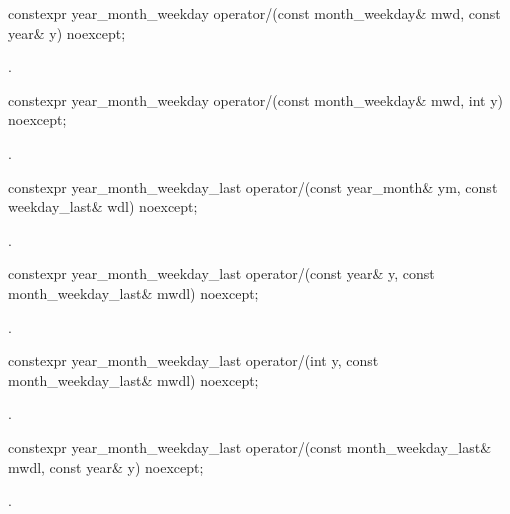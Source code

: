 \begin{itemdecl}
constexpr year_month_weekday
  operator/(const month_weekday& mwd, const year& y) noexcept;
\end{itemdecl}

\begin{itemdescr}
\pnum
\returns {}.
\end{itemdescr}

\begin{itemdecl}
constexpr year_month_weekday
  operator/(const month_weekday& mwd, int y) noexcept;
\end{itemdecl}

\begin{itemdescr}
\pnum
\returns {}.
\end{itemdescr}

\begin{itemdecl}
constexpr year_month_weekday_last
  operator/(const year_month& ym, const weekday_last& wdl) noexcept;
\end{itemdecl}

\begin{itemdescr}
\pnum
\returns {}.
\end{itemdescr}

\begin{itemdecl}
constexpr year_month_weekday_last
  operator/(const year& y, const month_weekday_last& mwdl) noexcept;
\end{itemdecl}

\begin{itemdescr}
\pnum
\returns {}.
\end{itemdescr}

\begin{itemdecl}
constexpr year_month_weekday_last
  operator/(int y, const month_weekday_last& mwdl) noexcept;
\end{itemdecl}

\begin{itemdescr}
\pnum
\returns {}.
\end{itemdescr}

\begin{itemdecl}
constexpr year_month_weekday_last
  operator/(const month_weekday_last& mwdl, const year& y) noexcept;
\end{itemdecl}

\begin{itemdescr}
\pnum
\returns {}.
\end{itemdescr}

